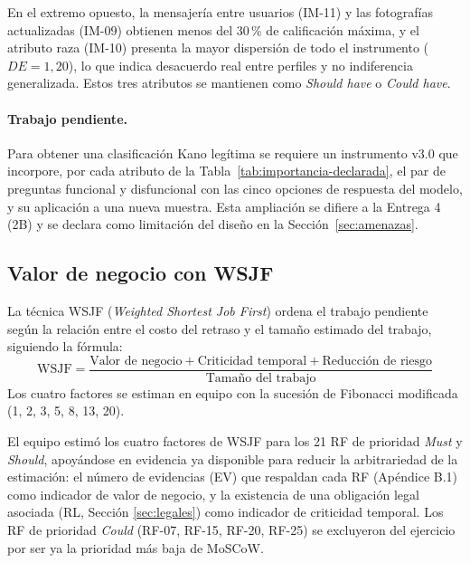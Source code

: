 \documentclass[journal,onecolumn]{IEEEtran}
\begin{document}
	En el extremo opuesto, la mensajería entre usuarios (IM-11) y las
	fotografías actualizadas (IM-09) obtienen menos del 30\,\% de calificación
	máxima, y el atributo raza (IM-10) presenta la mayor dispersión de todo el
	instrumento ($DE = 1{,}20$), lo que indica desacuerdo real entre perfiles y
	no indiferencia generalizada. Estos tres atributos se mantienen como
	\emph{Should have} o \emph{Could have}.
	
	\paragraph{Trabajo pendiente.}
	Para obtener una clasificación Kano legítima se requiere un instrumento
	v3.0 que incorpore, por cada atributo de la Tabla~\ref{tab:importancia-declarada},
	el par de preguntas funcional y disfuncional con las cinco opciones de
	respuesta del modelo, y su aplicación a una nueva muestra. Esta ampliación
	se difiere a la Entrega 4 (2B) y se declara como limitación del diseño en la
	Sección~\ref{sec:amenazas}.
	
	\subsection{Valor de negocio con WSJF}
	\label{sec:wsjf}
	
	La técnica WSJF (\emph{Weighted Shortest Job First}) ordena el trabajo
	pendiente según la relación entre el costo del retraso y el tamaño estimado
	del trabajo, siguiendo la fórmula:
	\[
	\mathrm{WSJF} = \frac{\text{Valor de negocio} + \text{Criticidad temporal} + \text{Reducción de riesgo}}{\text{Tamaño del trabajo}}
	\]
	Los cuatro factores se estiman en equipo con la sucesión de Fibonacci
	modificada (1, 2, 3, 5, 8, 13, 20).
	
	El equipo estimó los cuatro factores de WSJF para los 21 RF de prioridad
	\emph{Must} y \emph{Should}, apoyándose en evidencia ya disponible para
	reducir la arbitrariedad de la estimación: el número de evidencias (EV) que
	respaldan cada RF (Apéndice B.1) como indicador de valor de negocio, y la
	existencia de una obligación legal asociada (RL, Sección \ref{sec:legales})
	como indicador de criticidad temporal. Los RF de prioridad \emph{Could}
	(RF-07, RF-15, RF-20, RF-25) se excluyeron del ejercicio por ser ya la
	prioridad más baja de MoSCoW.
	
\end{document}
